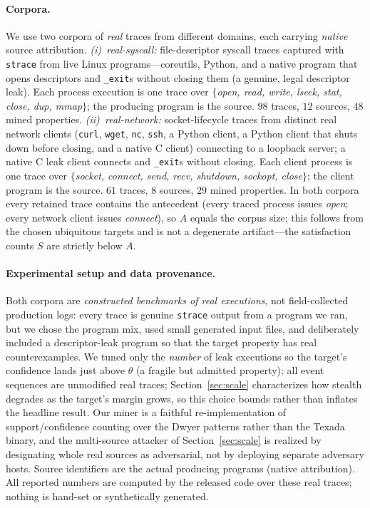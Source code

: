 \documentclass[runningheads]{llncs}
\begin{document}
\paragraph{Corpora.} We use two corpora of \emph{real} traces from different
domains, each carrying \emph{native} source attribution.
\emph{(i)~real-syscall:} file-descriptor syscall traces captured with
\texttt{strace} from live Linux programs---coreutils, Python, and a native program
that opens descriptors and \texttt{\_exit}s without closing them (a genuine,
legal descriptor leak). Each process execution is one trace over
$\{$\textit{open, read, write, lseek, stat, close, dup, mmap}$\}$; the producing
program is the source. $98$ traces, $12$ sources, $48$ mined properties.
\emph{(ii)~real-network:} socket-lifecycle traces from distinct real network
clients (\texttt{curl}, \texttt{wget}, \texttt{nc}, \texttt{ssh}, a Python client,
a Python client that shuts down before closing, and a native C client) connecting
to a loopback server; a native C leak client connects and \texttt{\_exit}s without
closing. Each client process is one trace over
$\{$\textit{socket, connect, send, recv, shutdown, sockopt, close}$\}$; the client
program is the source. $61$ traces, $8$ sources, $29$ mined properties. In both
corpora every retained trace contains the antecedent (every traced process issues
\textit{open}; every network client issues \textit{connect}), so $A$ equals the
corpus size; this follows from the chosen ubiquitous targets and is not a
degenerate artifact---the satisfaction counts $S$ are strictly below $A$.

\paragraph{Experimental setup and data provenance.}
Both corpora are \emph{constructed benchmarks of real executions}, not
field-collected production logs: every trace is genuine \texttt{strace} output
from a program we ran, but we chose the program mix, used small generated input
files, and deliberately included a descriptor-leak program so that the target
property has real counterexamples. We tuned only the \emph{number} of leak
executions so the target's confidence lands just above $\theta$ (a fragile but
admitted property); all event sequences are unmodified real traces; Section~\ref{sec:scale} characterizes how stealth degrades as the target's margin grows, so this choice bounds rather than inflates the headline result. Our miner is
a faithful re-implementation of support/confidence counting over the Dwyer
patterns rather than the Texada binary, and the multi-source attacker of
Section~\ref{sec:scale} is realized by designating whole real sources as
adversarial, not by deploying separate adversary hosts. Source identifiers are
the actual producing programs (native attribution). All reported numbers are
computed by the released code over these real traces; nothing is hand-set or
synthetically generated.
\end{document}
